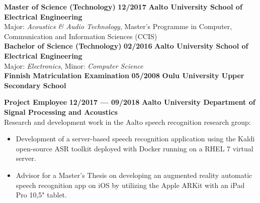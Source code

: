 \documentclass[8pt,a4paper,oneside]{article}
\newcommand{\myrule}{\vspace{0.5mm} {\color{lightgray}{\hrule height 0.5pt width \textwidth depth 0pt}} \vspace{1mm}}
\newcommand{\titledate}[2]{{\bfseries \color{textcolor} \large #1} \hfill \textbf{#2} \myrule}
\newcommand{\workplace}[1]{{\bfseries \fontsize{10.5}{10.5}\selectfont #1}}
\newcommand{\sectitle}[1]{{\sc \bfseries \LARGE #1}}
\newcommand{\boxarc}{2.5mm}
\newcommand{\boxtop}{1.5mm}
\begin{document}
	\vspace{0.5mm} %
	
\begin{minipage}[t]{0.64\textwidth}
	
	
	\begin{tcolorbox}[top=1mm,bottom=1mm,right=1mm,left=1mm,arc=\boxarc,toptitle=\boxtop,bottomtitle=1mm,title=\sectitle{Education},box align=top]
	
	\titledate{Master of Science (Technology)}{12/2017}
	\workplace{Aalto University School of Electrical Engineering} \\
	Major: \textit{Acoustics \& Audio Technology}, Master's Programme in Computer, Communication and Information Sciences (CCIS) \\
	
	\titledate{Bachelor of Science (Technology)}{02/2016}
	\workplace{Aalto University School of Electrical Engineering} \\
	Major: \textit{Electronics}, Minor: \textit{Computer Science} \\
	
	\titledate{Finnish Matriculation Examination}{05/2008}
	\workplace{Oulu University Upper Secondary School}
	\end{tcolorbox} \vspace{\baselineskip}
	
	\begin{tcolorbox}[top=1mm,bottom=1mm,right=1mm,left=1mm,arc=\boxarc,toptitle=\boxtop,bottomtitle=1mm,title=\sectitle{Experience},box align=bottom]
		
	{\bfseries \color{textcolor} \large Project Employee } \hfill \textbf{12/2017 --- 09/2018} \myrule
	\workplace{Aalto University Department of Signal Processing and Acoustics} \\
	Research and development work in the Aalto speech recognition research group:
	\begin{itemize}[leftmargin=0.4cm, itemsep=0.5mm,parsep=0pt,topsep=0.5mm,label={\large\textbullet}]
		\small
		\item Development of a server-based speech recognition application using the Kaldi open-source ASR toolkit deployed with Docker running on a RHEL 7 virtual server.
		\item Advisor for a Master's Thesis on developing an augmented reality automatic speech recognition app on iOS by utilizing the Apple ARKit with an iPad Pro 10,5" tablet. \\
	\end{itemize}
	

\end{tcolorbox}
\end{minipage}
\end{document}
